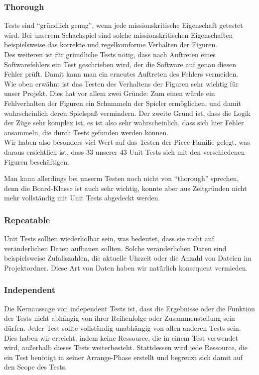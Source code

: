 \documentclass[
10pt, %
a4paper, %
oneside, %
headinclude,footinclude, %
BCOR5mm, %
]{scrartcl}
\begin{document}
\begin{onehalfspace}
\subsubsection{Thorough}
Tests sind \enquote{gründlich genug}, wenn jede missionskritische Eigenschaft getestet wird. Bei unserem Schachspiel sind solche missionskritischen Eigenschaften beispielsweise das korrekte und regelkomforme Verhalten der Figuren. 
\\
Des weiteren ist für gründliche Tests nötig, dass nach Auftreten eines Softwarefehlers ein Test geschrieben wird, der die Software auf genau diesen Fehler prüft. Damit kann man ein erneutes Auftreten des Fehlers vermeiden.
\\
Wie oben erwähnt ist das Testen des Verhaltens der Figuren sehr wichtig für unser Projekt. Dies hat vor allem zwei Gründe:
Zum einen würde ein Fehlverhalten der Figuren ein Schummeln der Spieler ermöglichen, und damit wahrscheinlich deren Spielspaß vermindern. 
Der zweite Grund ist, dass die Logik der Züge sehr komplex ist, es ist also sehr wahrscheinlich, dass sich hier Fehler ansammeln, die durch Tests gefunden werden können.
\\
Wir haben also besonders viel Wert auf das Testen der Piece-Familie gelegt, was daraus ersichtlich ist, dass 33 unserer 43 Unit Tests sich mit den verschiedenen Figuren beschäftigen.

Man kann allerdings bei unserm Testen noch nicht von \enquote{thorough} sprechen, denn die Board-Klasse ist auch sehr wichtig, konnte aber aus Zeitgründen nicht mehr vollständig mit Unit Tests abgedeckt werden.

\subsubsection{Repeatable}
Unit Tests sollten wiederholbar sein, was bedeutet, dass sie nicht auf veränderlichen Daten aufbauen sollten. Solche veränderlichen Daten sind beispielsweise Zufallszahlen, die aktuelle Uhrzeit oder die Anzahl von Dateien im Projektordner. Diese Art von Daten haben wir natürlich konsequent vermieden.
\subsubsection{Independent}
Die Kernaussage von independent Tests ist, dass die Ergebnisse oder die Funktion der Tests nicht abhängig von ihrer Reihenfolge oder Zusammenstellung sein dürfen. Jeder Test sollte vollständig unabhängig von allen anderen Tests sein. Dies haben wir erreicht, indem keine Ressource, die in einem Test verwendet wird, außerhalb dieses Tests weiterbesteht. Stattdessen wird jede Ressource, die ein Test benötigt in seiner Arrange-Phase erstellt und begrenzt sich damit auf den Scope des Tests.

\end{onehalfspace}
\end{document}
